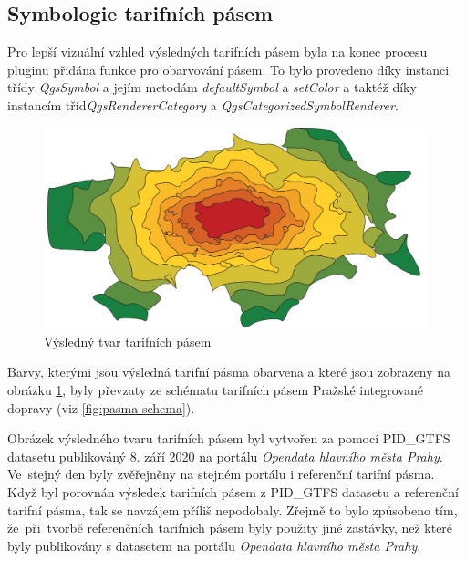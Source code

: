 \subsection{Symbologie tarifních pásem}
\label{symbologie}

Pro lepší vizuální vzhled výsledných tarifních pásem byla na konec procesu pluginu přidána funkce
pro obarvování pásem. To bylo provedeno díky instanci třídy \textit{QgsSymbol} a jejím metodám 
\textit{defaultSymbol} a \textit{setColor} a taktéž díky instancím tříd\textit{QgsRendererCategory}
a \textit{QgsCategorizedSymbolRenderer}.

\begin{figure}[H] \centering
    \includegraphics[width=400pt]{./pictures/vysledek2.png}
    \caption[Výsledný tvar tarifních pásem]{Výsledný tvar tarifních pásem}
	\label{fig:vysledek}              
\end{figure}

Barvy, kterými jsou výsledná tarifní pásma obarvena a které jsou zobrazeny na obrázku \ref{fig:vysledek}, byly převzaty
ze schématu tarifních pásem Pražské integrované dopravy (viz \ref{fig:pasma-schema}).  

Obrázek výsledného tvaru tarifních pásem byl vytvořen za pomocí PID\_GTFS datasetu publikováný 8. září 2020 na portálu \textit{Opendata
hlavního města Prahy}. Ve~stejný den byly zvěřejněny na stejném portálu i referenční tarifní pásma.
Když byl porovnán výsledek tarifních pásem z PID\_GTFS datasetu a referenční ta\-rifní pásma, tak
se navzájem příliš nepodobaly. Zřejmě to bylo způsobeno tím, že~při~tvorbě referenčních tarifních pásem byly použity jiné zastávky,
než které byly publikovány s datasetem na portálu \textit{Opendata hlavního města Prahy}.
